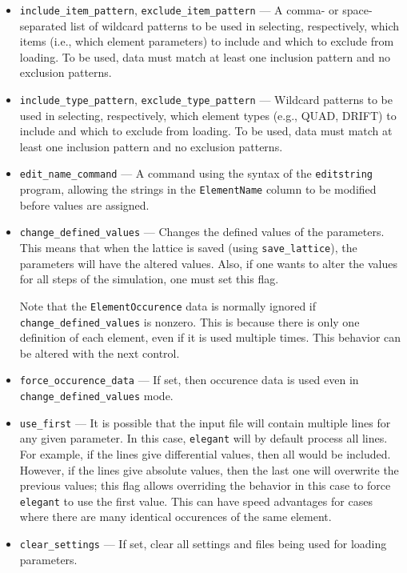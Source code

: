 \documentclass[11pt]{article}
\begin{document}
\begin{itemize}
\item \verb|include_item_pattern|, \verb|exclude_item_pattern| ---
A comma- or space-separated list of wildcard patterns to be used in selecting, respectively, which items
(i.e., which element parameters) to include and which to exclude from
loading.
To be used, data must match at least one inclusion pattern and no exclusion patterns.


\item \verb|include_type_pattern|, \verb|exclude_type_pattern| ---
Wildcard patterns to be used in selecting, respectively, which element
types (e.g., QUAD, DRIFT) to include and which to exclude from
loading.
To be used, data must match at least one inclusion pattern and no exclusion patterns.

\item \verb|edit_name_command| --- A command using the syntax of the {\tt editstring} program, allowing
  the strings in the \verb|ElementName| column to be modified before values are assigned.

\item \verb|change_defined_values| --- Changes the defined values of
the parameters.  This means that when the lattice is saved (using
\verb|save_lattice|), the parameters will have the altered values.
Also, if one wants to alter the values for all steps of the simulation,
one must set this flag. 

Note that the \verb|ElementOccurence| data is normally ignored if
\verb|change_defined_values| is nonzero.  This is because there is
only one definition of each element, even if it is used multiple times.
This behavior can be altered with the next control.

\item \verb|force_occurence_data| --- If set, then occurence data is
used even in \verb|change_defined_values| mode.

\item \verb|use_first| --- It is possible that the input file will contain
multiple lines for any given parameter.  In this case, {\tt elegant} will
by default process all lines.  For example, if the lines give differential values,
then all would be included. However, if the lines give absolute values, then the
last one will overwrite the previous values; this flag allows overriding the
behavior in this case to force {\tt elegant} to use the first value.
This can have speed advantages for cases where there are many identical
occurences of the same element.

\item \verb|clear_settings| --- If set, clear all settings and files
being used for loading parameters.


\end{itemize}
\end{document}
